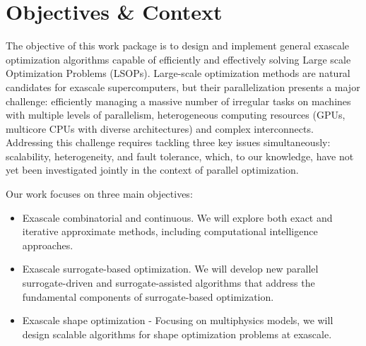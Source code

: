 
\section{Objectives \& Context}
The objective of this work package is to design and implement general exascale optimization algorithms capable of efficiently and effectively solving Large scale Optimization Problems (LSOPs). Large-scale optimization methods are natural candidates for exascale supercomputers, but their parallelization presents a major challenge: efficiently managing a massive number of irregular tasks on machines with multiple levels of parallelism, heterogeneous computing resources (GPUs, multicore CPUs with diverse architectures) and complex interconnects. Addressing this challenge requires tackling three key issues simultaneously: scalability, heterogeneity, and fault tolerance, which, to our knowledge, have not yet been investigated jointly in the context of parallel optimization.

Our work focuses on three main objectives:
\begin{itemize}
\item Exascale combinatorial and continuous. We will explore both exact and iterative approximate methods, including computational intelligence approaches.

\item Exascale surrogate-based optimization. We will develop new parallel surrogate-driven and surrogate-assisted algorithms that address the fundamental components of surrogate-based optimization.

\item Exascale shape optimization - Focusing on multiphysics models, we will design scalable algorithms for shape optimization problems at exascale.

\end{itemize}

